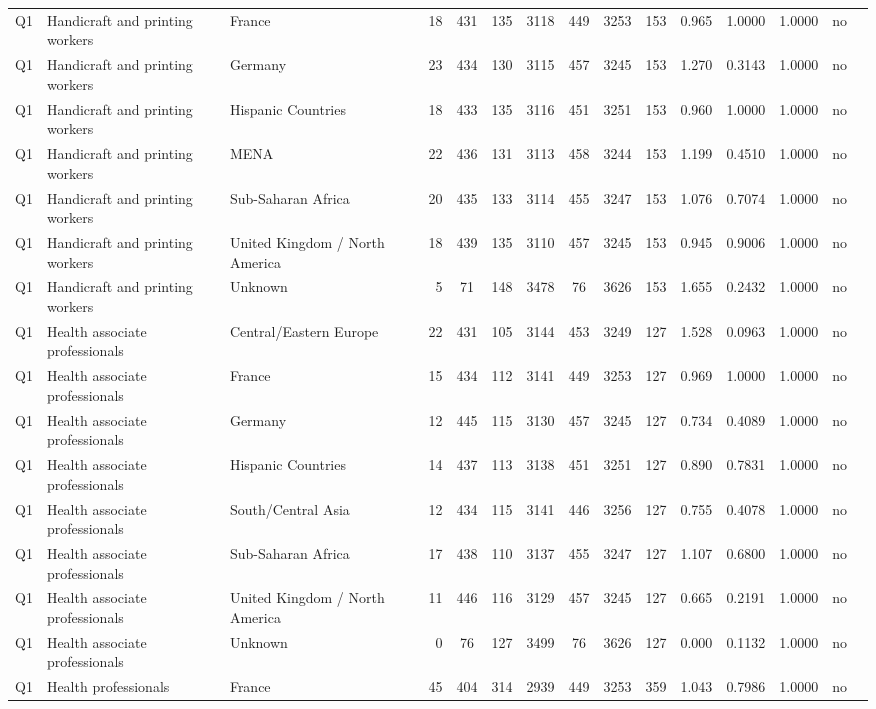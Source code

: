 \begin{longtable}{lllrcccccccccll}
Q1 & Handicraft and printing workers & France & 18 & 431 & 135 & 3118 & 449 & 3253 & 153 & 0.965 & 1.0000 & 1.0000 & no \\
Q1 & Handicraft and printing workers & Germany & 23 & 434 & 130 & 3115 & 457 & 3245 & 153 & 1.270 & 0.3143 & 1.0000 & no \\
Q1 & Handicraft and printing workers & Hispanic Countries & 18 & 433 & 135 & 3116 & 451 & 3251 & 153 & 0.960 & 1.0000 & 1.0000 & no \\
Q1 & Handicraft and printing workers & MENA & 22 & 436 & 131 & 3113 & 458 & 3244 & 153 & 1.199 & 0.4510 & 1.0000 & no \\
Q1 & Handicraft and printing workers & Sub-Saharan Africa & 20 & 435 & 133 & 3114 & 455 & 3247 & 153 & 1.076 & 0.7074 & 1.0000 & no \\
Q1 & Handicraft and printing workers & United Kingdom / North America & 18 & 439 & 135 & 3110 & 457 & 3245 & 153 & 0.945 & 0.9006 & 1.0000 & no \\
Q1 & Handicraft and printing workers & Unknown & 5 & 71 & 148 & 3478 & 76 & 3626 & 153 & 1.655 & 0.2432 & 1.0000 & no \\
Q1 & Health associate professionals & Central/Eastern Europe & 22 & 431 & 105 & 3144 & 453 & 3249 & 127 & 1.528 & 0.0963 & 1.0000 & no \\
Q1 & Health associate professionals & France & 15 & 434 & 112 & 3141 & 449 & 3253 & 127 & 0.969 & 1.0000 & 1.0000 & no \\
Q1 & Health associate professionals & Germany & 12 & 445 & 115 & 3130 & 457 & 3245 & 127 & 0.734 & 0.4089 & 1.0000 & no \\
Q1 & Health associate professionals & Hispanic Countries & 14 & 437 & 113 & 3138 & 451 & 3251 & 127 & 0.890 & 0.7831 & 1.0000 & no \\
Q1 & Health associate professionals & South/Central Asia & 12 & 434 & 115 & 3141 & 446 & 3256 & 127 & 0.755 & 0.4078 & 1.0000 & no \\
Q1 & Health associate professionals & Sub-Saharan Africa & 17 & 438 & 110 & 3137 & 455 & 3247 & 127 & 1.107 & 0.6800 & 1.0000 & no \\
Q1 & Health associate professionals & United Kingdom / North America & 11 & 446 & 116 & 3129 & 457 & 3245 & 127 & 0.665 & 0.2191 & 1.0000 & no \\
Q1 & Health associate professionals & Unknown & 0 & 76 & 127 & 3499 & 76 & 3626 & 127 & 0.000 & 0.1132 & 1.0000 & no \\
Q1 & Health professionals & France & 45 & 404 & 314 & 2939 & 449 & 3253 & 359 & 1.043 & 0.7986 & 1.0000 & no \\

\end{longtable}
